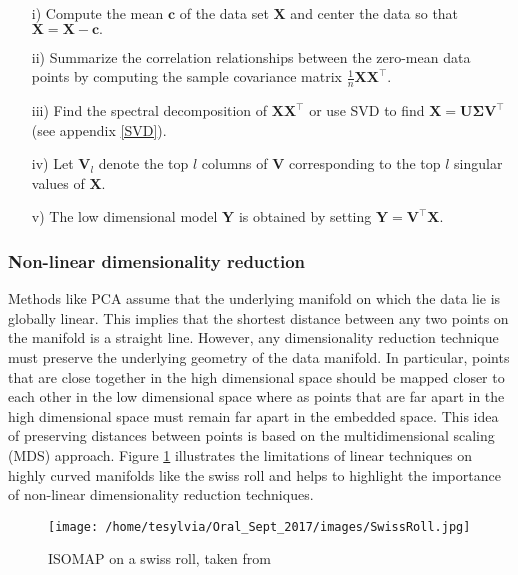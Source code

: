 \begin{itemize}
\item[i)] Compute the mean $\textbf{c}$ of the data set $\textbf{X}$ and center
the data so that $\textbf{X} = \textbf{X} - \textbf{c}.$
\item[ii)] Summarize the correlation relationships between the zero-mean data points by computing the sample covariance matrix $\frac{1}{n}\textbf{XX}^{\top}.$
\item[iii)] Find the spectral decomposition of $\textbf{XX}^{\top}$ or 
use SVD to find $\textbf{X} = \bm{U\Sigma V^{\top}}$  (see appendix \ref{SVD}).
\item[iv)] Let $\bm{V}_{l}$ denote the top $l$ columns of $\textbf{V}$ corresponding to the  top $l$ singular values of $\textbf{X}$.
\item[v)] The low dimensional model $\textbf{Y}$ is obtained by setting 
$\textbf{Y} = \textbf{V}^{\top}\textbf{X}$.
\end{itemize}

\subsubsection{Non-linear dimensionality reduction}

Methods like PCA assume that the underlying manifold on which the data lie is globally linear. This implies that the shortest distance between any two points on the manifold is a straight line.
However, any dimensionality reduction technique must preserve the underlying geometry of the data manifold. In particular, points that are close together in the high dimensional space should be mapped closer to each other in the low dimensional space where as points that are far apart in the high dimensional space must remain far apart in the embedded space. This idea of preserving distances between points is based on the multidimensional scaling (MDS) approach.
Figure \ref{fig:Swiss roll} illustrates the limitations of linear techniques on highly curved manifolds like the swiss roll and helps to highlight the importance of non-linear dimensionality reduction techniques.

\begin{figure}[h]
\centering
\texttt{[image: /home/tesylvia/Oral\_Sept\_2017/images/SwissRoll.jpg]}
\caption{ISOMAP on a swiss roll, taken from \cite{TenenbaumJB2000Aggf}}
      \label{fig:Swiss roll}
\end{figure}



